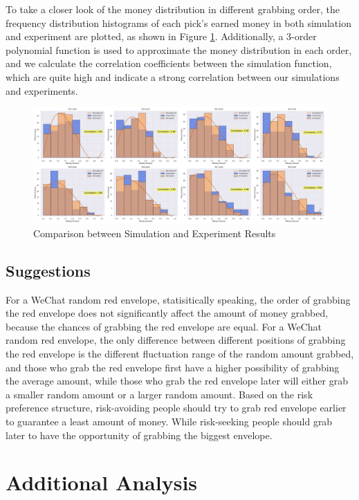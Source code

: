 \documentclass{scrartcl}
\begin{document}
\par
To take a closer look of the money distribution in different grabbing order, the frequency distribution histograms of each pick's earned money in both simulation and experiment are plotted, as shown in Figure \ref{comp1}. Additionally, a 3-order polynomial function is used to approximate the money distribution in each order, and we calculate the correlation coefficients between the simulation function, which are quite high and indicate a strong correlation between our simulations and experiments.
\begin{figure}[H]
	\begin{center}
		\includegraphics[width=16cm]{pic5.pdf}
	\end{center}
	\caption{Comparison between Simulation and Experiment Results}
	\label{comp1}
\end{figure}
\subsection{Suggestions}
For a WeChat random red envelope, statisitically speaking, the order of grabbing the red envelope does not significantly affect the amount of money grabbed, because the chances of grabbing the red envelope are equal. For a WeChat random red envelope, the only difference between different positions of grabbing the red envelope is the different fluctuation range of the random amount grabbed, and those who grab the red envelope first have a higher possibility of grabbing the average amount, while those who grab the red envelope later will either grab a smaller random amount or a larger random amount. Based on the risk preference structure, risk-avoiding people should try to grab red envelope earlier to guarantee a least amount of money. While risk-seeking people should grab later to have the opportunity of grabbing the biggest envelope.




\section{Additional Analysis}\label{sec5}
\end{document}
